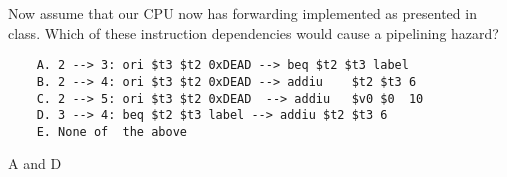 \begin{blocksection}

\question
Now assume that our CPU now has forwarding implemented as presented in class. Which of these instruction dependencies would cause a pipelining hazard?
\begin{verbatim}
    A. 2 --> 3: ori $t3 $t2 0xDEAD --> beq $t2 $t3 label
    B. 2 --> 4: ori	$t3	$t2	0xDEAD --> addiu	$t2	$t3	6
    C. 2 --> 5: ori	$t3	$t2	0xDEAD	--> addiu	$v0	$0	10
    D. 3 --> 4: beq $t2 $t3 label --> addiu $t2 $t3 6
    E. None	of	the	above
\end{verbatim}
\begin{solution}
A and D
\end{solution}

\end{blocksection}